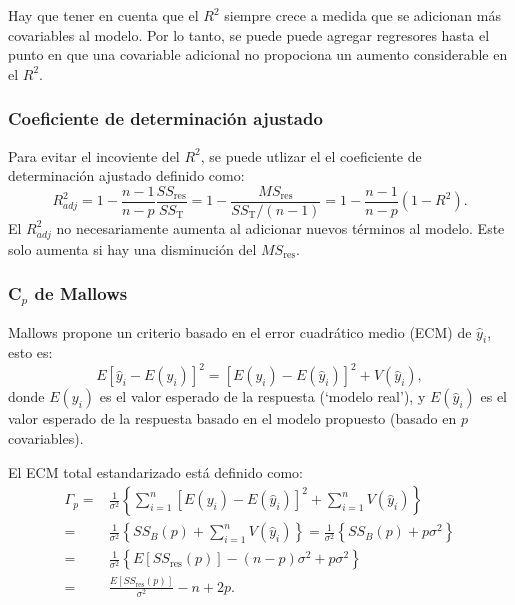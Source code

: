 \documentclass[
]{article}
\begin{document}
Hay que tener en cuenta que el \(R^{2}\) siempre crece a medida que se adicionan más covariables al modelo. Por lo tanto, se puede puede agregar regresores hasta el punto en que una covariable adicional no propociona un aumento considerable en el \(R^{2}\).

\hypertarget{coeficiente-de-determinaciuxf3n-ajustado}{%
\subsubsection{Coeficiente de determinación ajustado}\label{coeficiente-de-determinaciuxf3n-ajustado}}

Para evitar el incoviente del \(R^{2}\), se puede utlizar el el coeficiente de determinación ajustado definido como:
\[
R^{2}_{adj} = 1 - \frac{n-1}{n-p}\frac{SS_{\mbox{res}}}{SS_{\mbox{T}}} = 1- \frac{MS_{\mbox{res}}}{SS_{\mbox{T}}/(n-1)} = 1- \frac{n-1}{n-p}(1-R^{2}).
\]
El \(R^{2}_{adj}\) no necesariamente aumenta al adicionar nuevos términos al modelo. Este solo aumenta si hay una disminución del \(MS_{\mbox{res}}\).

\hypertarget{c_p-de-mallows}{%
\subsubsection{\texorpdfstring{C\(_p\) de Mallows}{C\_p de Mallows}}\label{c_p-de-mallows}}

Mallows propone un criterio basado en el error cuadrático medio (ECM) de \(\widehat{y}_i\), esto es:
\[
E[\widehat{y}_{i}- E(y_{i})]^2 = [E(y_{i}) - E(\widehat{y}_{i})]^2 + V(\widehat{y}_{i}),
\]
donde \(E(y_{i})\) es el valor esperado de la respuesta (`modelo real'), y \(E(\widehat{y}_{i})\) es el valor esperado de la respuesta basado en el modelo propuesto (basado en \(p\) covariables).

El ECM total estandarizado está definido como:
\begin{equation}
\begin{split}
\Gamma_{p} =& \frac{1}{\sigma^{2}}\left\{\sum_{i=1}^{n}[E(y_{i}) - E(\widehat{y}_{i})]^2 + \sum_{i=1}^{n}  V(\widehat{y}_{i}) \right\} \\
=&  \frac{1}{\sigma^{2}}\left\{SS_{B}(p)  + \sum_{i=1}^{n}  V(\widehat{y}_{i}) \right\} = \frac{1}{\sigma^{2}}\left\{SS_{B}(p)  + p\sigma^{2} \right\} \\
=& \frac{1}{\sigma^{2}}\left\{ E[SS_{\mbox{res}}(p)] - (n-p)\sigma^{2} + p\sigma^{2} \right\} \\ =& \frac{E[SS_{\mbox{res}}(p)]}{\sigma^{2}} - n + 2p.
\end{split}
\nonumber
\end{equation}
\end{document}
